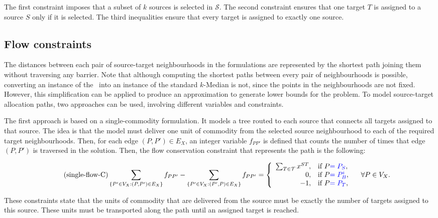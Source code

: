 \documentclass[a4paper,  review, authoryear, 1p.]{elsarticle}
\newcommand{\KMPHN}{{\sf{H-KMPHN}}}
\newcommand{\CV}[1]{{\color{blue}#1}}
\begin{document}
	The first constraint imposes that a subset of $k$ sources is selected in $\mathcal S$. The second constraint ensures that one target $T$ is assigned to a source $S$ only if it is selected. The third inequalities ensure that every target is assigned to exactly one source.
	
	\subsection{Flow constraints}
	The distances between each pair of source-target neighbourhoods in the formulations are represented by the shortest path joining them without traversing any barrier. Note that although computing the shortest paths between every pair of neighbourhoods is possible, converting an instance of the \KMPHN \ into an instance of the standard $k$-Median is not, since the points in the neighbourhoods are not fixed. However, this simplification can be applied to produce an approximation to generate lower bounds for the problem. To model source-target allocation paths, two approaches can be used, involving different variables and constraints. 
	
	The first approach is based on a single-commodity formulation. It models a tree routed to each source that connects all targets assigned to that source. The idea is that the model must deliver one unit of commodity from the selected source neighbourhood to each of the required target neighbourhoods. Then, for each edge $(P, P')\in E_X$, an integer variable $f_{PP'}$ is defined that counts the number of times that edge $(P, P')$ is traversed in the solution. Then, the flow conservation constraint that represents the path is the following:
	
	{\small
	\begin{equation}\label{eq:single-flowC}\tag{single-flow-C}
		\sum_{\{P'\in V_X:(P,P')\in E_X\}}f_{PP'}-\sum_{\{P'\in V_X:(P',P)\in E_X\}}f_{PP'} =\left\{
		\begin{array}{rl} 
			\sum_{T\in\mathcal T} x^{ST}, & \text{if } P\CV{=P_S}, \\
			0, & \text{if } P\CV{=P_B^i}, \\
			-1, & \text{if }P\CV{=P_T},
		\end{array}
		\right.\quad\forall P\in V_X.
	\end{equation}}

	These constraints state that the units of commodity that are delivered from the source must be exactly the number of targets assigned to this source. These units must be transported along the path until an assigned target is reached.
	
\end{document}
